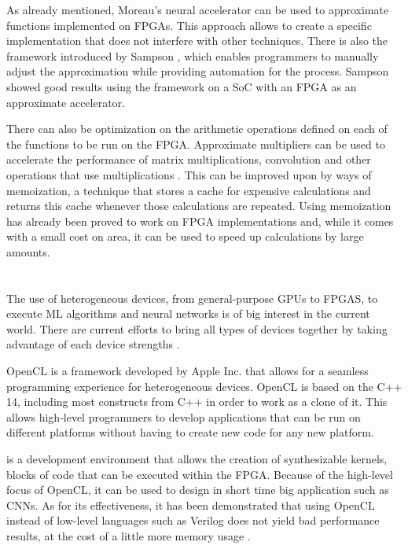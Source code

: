 As already mentioned, Moreau's neural accelerator can be used to approximate functions implemented
on FPGAs. This approach allows to create a specific implementation that does not interfere
with other techniques. There is also the framework introduced by Sampson \cite{sampson2015accept},
which enables programmers to manually adjust the approximation while providing automation
for the process. Sampson showed good results using the framework on a SoC with an FPGA as an
approximate accelerator.

There can also be optimization on the arithmetic operations defined on each of the functions
to be run on the FPGA. Approximate multipliers can be used to accelerate the performance
of matrix multiplications, convolution and other operations that use multiplications
\cite{ullah2018smapproxlib}. This can be improved upon by ways of memoization, a technique
that stores a cache for expensive calculations and returns this cache whenever those
calculations are repeated. Using memoization has already been proved to work on FPGA
implementations \cite{sinha2016low} and, while it comes with a small cost on area, it can be used to speed
up calculations by large amounts.

\section{\intelOCLnos}

The use of heterogeneous devices, from general-purpose GPUs to FPGAS, to execute 
ML algorithms and neural networks
is of big interest in the current world. There are current efforts to bring
all types of devices together by taking
advantage of each device strengths \cite{abadi2016tensorflow}.

OpenCL is a framework developed by Apple Inc. that allows for a seamless
programming experience for heterogeneous devices. OpenCL is based on 
the C++ 14, including most constructs from C++ in order to work as a
clone of it. This allows high-level programmers to develop applications
that can be run on different platforms without having to create new code
for any new platform.

\intelOCLnos is a development environment that allows the creation of
synthesizable kernels, blocks of code that can be executed within the FPGA.
Because of the high-level focus of OpenCL, it can be used to design in short
time big application such as CNNs. As for its effectiveness, it has been
demonstrated that using OpenCL instead of low-level languages such as Verilog
does not yield bad performance results, at the cost of a little more memory
usage \cite{abdelfattah2014gzip}.

